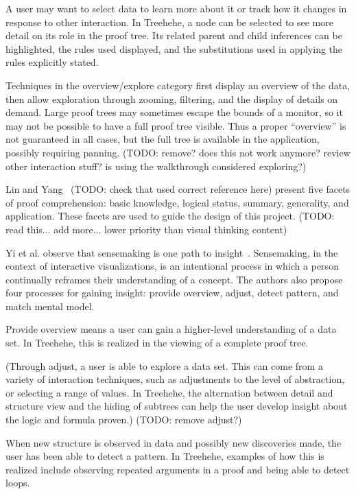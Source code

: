 \documentclass[conference]{IEEEtran}
\newcommand{\projectname}{Treehehe}
\begin{document}
A user may want to select data to learn more about it or track how it changes in response to other interaction. In \projectname{}, a node can be selected to see more detail on its role in the proof tree. Its related parent and child inferences can be highlighted, the rules used displayed, and the substitutions used in applying the rules explicitly stated.

Techniques in the overview/explore category first display an overview of the data, then allow exploration through zooming, filtering, and the display of details on demand. Large proof trees may sometimes escape the bounds of a monitor, so it may not be possible to have a full proof tree visible. Thus a proper ``overview'' is not guaranteed in all cases, but the full tree is available in the application, possibly requiring panning. (TODO: remove? does this not work anymore? review other interaction stuff? is using the walkthrough considered exploring?)

Lin and Yang~\cite{readingcompgeometric-lin+yang} (TODO: check that used correct reference here) present five facets of proof comprehension: basic knowledge, logical status, summary, generality, and application. These facets are used to guide the design of this project. (TODO: read this... add more... lower priority than visual thinking content)

Yi et al. observe that sensemaking is one path to insight~\cite{insights-yi+etal}. Sensemaking, in the context of interactive visualizations, is an intentional process in which a person continually reframes their understanding of a concept. The authors also propose four processes for gaining insight: provide overview, adjust, detect pattern, and match mental model.

Provide overview means a user can gain a higher-level understanding of a data set. In \projectname{}, this is realized in the viewing of a complete proof tree.

(Through adjust, a user is able to explore a data set. This can come from a variety of interaction techniques, such as adjustments to the level of abstraction, or selecting a range of values. In \projectname{}, the alternation between detail and structure view and the hiding of subtrees can help the user develop insight about the logic and formula proven.) (TODO: remove adjust?)

When new structure is observed in data and possibly new discoveries made, the user has been able to detect a pattern. In \projectname{}, examples of how this is realized include observing repeated arguments in a proof and being able to detect loops.
\end{document}

